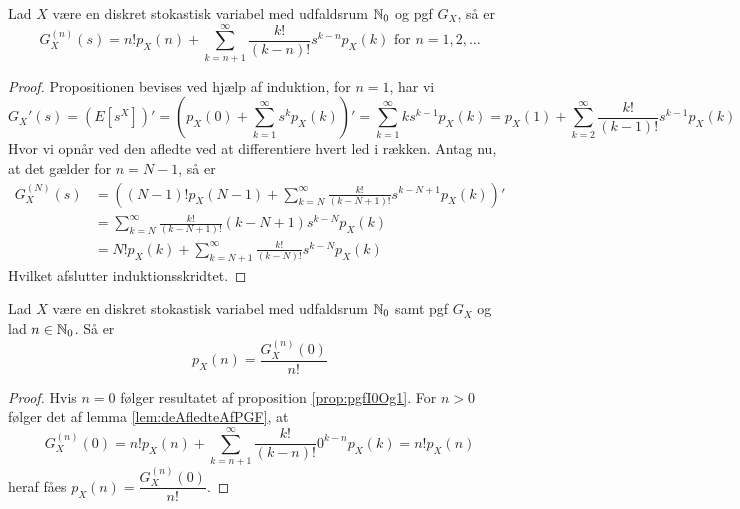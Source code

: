 \begin{lem} \label{lem:deAfledteAfPGF}
    Lad $X$ være en diskret stokastisk variabel med udfaldsrum $\mathbb{N}_0$ og pgf $G_X$, så er 
    \begin{equation*}
        G_X^{(n)}(s) = n! p_X(n) + \sum^\infty_{k = n + 1} \frac{k!}{(k - n)!} s^{k - n} p_X(k) \text{ for } n = 1, 2, \ldots
    \end{equation*}
\end{lem}

\begin{proof}
Propositionen bevises ved hjælp af induktion, for $n = 1$, har vi 
\begin{equation*}
    G_X'(s) = \left(E[s^X]\right)' = \left(p_X(0) + \sum^\infty_{k = 1} s^{k}p_X(k)\right)' = \sum^\infty_{k = 1} ks^{k - 1} p_X(k) = p_X(1) + \sum^\infty_{k = 2} \frac{k!}{(k - 1)!} s^{k - 1} p_X(k)
\end{equation*}
Hvor vi opnår ved den afledte ved at differentiere hvert led i rækken. Antag nu, at det gælder for $n = N - 1$, så er 
\begin{align*}
    G_X^{(N)}(s) &= \left((N - 1)!p_X(N - 1) + \sum^\infty_{k = N} \frac{k!}{(k - N + 1)!} s^{k - N + 1} p_X(k) \right)' \\ 
    &= \sum^\infty_{k = N} \frac{k!}{(k - N + 1)!}(k - N + 1) s^{k - N} p_X(k) \\ 
    &= N! p_X(k) + \sum^\infty_{k = N + 1} \frac{k!}{(k - N)!} s^{k - N} p_X(k) 
\end{align*}
Hvilket afslutter induktionsskridtet.
\end{proof}

\begin{thm}\label{thm:pgf2pmf} %
    Lad $X$ være en diskret stokastisk variabel med udfaldsrum $\mathbb{N}_0$ samt pgf $G_X$ og lad $n \in \mathbb{N}_0$. Så er
    \begin{equation*}
        p_X(n) = \frac{G_X^{(n)}(0)}{n!} 
    \end{equation*}
\end{thm}
\begin{proof}
Hvis $n = 0$ følger resultatet af proposition \ref{prop:pgfI0Og1}. For $n > 0$ følger det af lemma \ref{lem:deAfledteAfPGF}, at 
\begin{equation*}
    G_X^{(n)}(0) = n! p_X(n) + \sum^\infty_{k = n + 1} \frac{k!}{(k - n)!} 0^{k - n} p_X(k) = n! p_X(n)
\end{equation*}
heraf fåes $p_X(n) = \dfrac{G_X^{(n)}(0)}{n!}$.
\end{proof}

